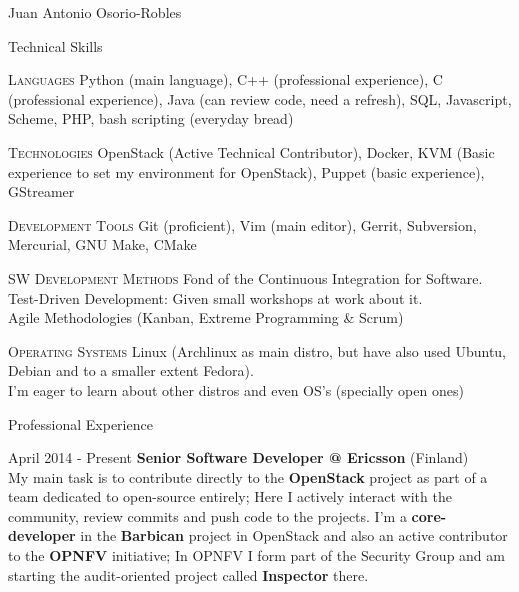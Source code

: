 \documentclass[english,11pt,letterpaper]{article}
\begin{document}
\begin{cv}{Juan Antonio Osorio-Robles}
	\begin{cvlist}{Technical Skills}
			\item [\textsc{Languages}]
                Python (main language), C++ (professional experience), C
                (professional experience), Java (can review code, need a
                refresh), SQL, Javascript, Scheme, PHP, bash
                scripting (everyday bread)
			\item [\textsc{Technologies}]
                OpenStack (Active Technical Contributor), Docker,
                KVM (Basic experience to set my environment for OpenStack),
                Puppet (basic experience), GStreamer
			\item [\textsc{Development Tools}]
                Git (proficient), Vim (main editor), Gerrit, Subversion,
                Mercurial, GNU Make, CMake
			\item [\textsc{SW Development Methods}]
				Fond of the Continuous Integration for Software.\\
                Test-Driven Development: Given small workshops at work about
                it.\\
                Agile Methodologies (Kanban, Extreme Programming \& Scrum)
			\item [\textsc{Operating Systems}]
                Linux (Archlinux as main distro, but have also used Ubuntu,
                Debian and to a smaller extent Fedora).\\
                I'm eager to learn about other distros and even OS's (specially
                open ones)
	\end{cvlist}

	\begin{cvlist}{Professional Experience}
		\item [April 2014 - Present]
            \textbf{Senior Software Developer @ Ericsson} (Finland)\\
            My main task is to contribute directly to the
            \textbf{OpenStack} project as part of a team dedicated to
            open-source entirely; Here I actively interact with the
            community, review commits and push code to the projects. I'm a
            \textbf{core-developer} in the \textbf{Barbican} project in
            OpenStack and also an active contributor to the \textbf{OPNFV}
            initiative; In OPNFV I form part of the Security Group and am
            starting the audit-oriented project called \textbf{Inspector}
            there.\\


\end{cvlist}
\end{cv}
\end{document}
